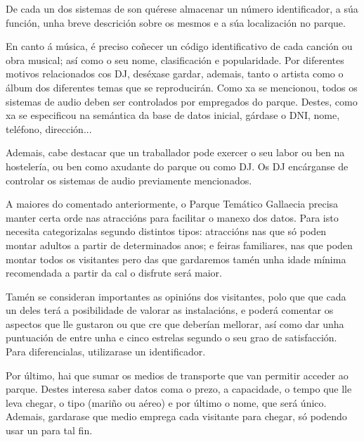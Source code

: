 \documentclass[12pt,a4paper]{book}
\theoremstyle{definition}
\theoremstyle{break}
\begin{document}
	De cada un dos sistemas de son quérese almacenar un número identificador, a súa función, unha breve descrición sobre os mesmos e a súa localización no
	parque.
	
	En canto á música, é preciso coñecer un código identificativo de cada canción
	ou obra musical; así como o seu nome, clasificación e popularidade. Por diferentes motivos relacionados cos DJ, deséxase gardar, ademais, tanto o artista como o
	álbum dos diferentes temas que se reproducirán.
	Como xa se mencionou, todos os sistemas de audio deben ser controlados por empregados
	do parque. Destes, como xa se especificou na semántica da base de datos
	inicial, gárdase o DNI, nome, teléfono, dirección...
	
	Ademais, cabe destacar que un traballador pode exercer o seu labor ou ben na
	hostelería, ou ben como axudante do parque ou como DJ. Os DJ encárganse de controlar
	os sistemas de audio previamente mencionados.
	
	A maiores do comentado anteriormente, o Parque Temático {\logo Gallaecia} precisa
	manter certa orde nas atraccións para facilitar o manexo dos datos. Para isto necesita categorizalas segundo distintos tipos: atraccións nas que só poden montar adultos a partir de determinados anos; e feiras familiares, nas que poden montar todos os visitantes pero das
	que gardaremos tamén unha idade mínima recomendada a partir da cal o disfrute
	será maior.
	
	Tamén se consideran importantes as opinións dos visitantes, polo que que cada un deles terá a posibilidade de valorar as instalacións, e poderá comentar os aspectos que lle gustaron ou que cre que deberían mellorar, así como dar unha puntuación de entre unha e cinco estrelas segundo o seu grao de satisfacción. Para diferencialas, utilizarase un identificador.
	
	Por último, hai que sumar os medios de transporte que van permitir acceder ao parque. Destes interesa saber datos coma o prezo, a capacidade, o tempo que lle leva chegar, o tipo (mariño ou aéreo) e por último o nome, que será único.
	Ademais, gardarase que medio emprega cada visitante para chegar, só podendo
	usar un para tal fin.
	
\end{document}
